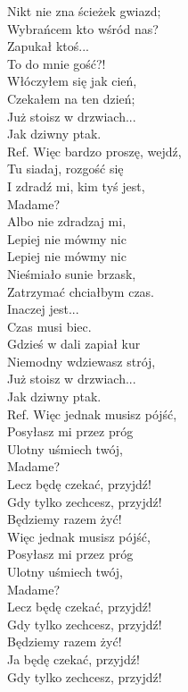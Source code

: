 
Nikt nie zna ścieżek gwiazd; \tab{}\\
Wybrańcem kto wśród nas? \tab{}\\
Zapukał ktoś... \tab{}\tab{}\\
To do mnie gość?! \tab{}\\
\hop
Włóczyłem się jak cień, \tab{}\\
Czekałem na ten dzień; \tab{}\\
Już stoisz w drzwiach... \tab{}\\
Jak dziwny ptak. \tab{}\\
\hops
Ref. Więc bardzo proszę, wejdź, \\
 Tu siadaj, rozgość się \tab{}\\
 I zdradź mi, kim tyś jest,\tab{} \\
 Madame?\tab{}\tab{} \\
 Albo nie zdradzaj mi, \tab{}\\
 Lepiej nie mówmy nic \tab{}\\
 Lepiej nie mówmy nic \tab{}\\
\hops
Nieśmiało sunie brzask, \\
Zatrzymać chciałbym czas. \\
Inaczej jest... \\
Czas musi biec. \\
\hop
Gdzieś w dali zapiał kur \\
Niemodny wdziewasz strój, \\
Już stoisz w drzwiach... \\
Jak dziwny ptak. \\
\hops
Ref. Więc jednak musisz pójść,\\
 Posyłasz mi przez próg \\
 Ulotny uśmiech twój, \\
 Madame? \\
 Lecz będę czekać, przyjdź! \\
 Gdy tylko zechcesz, przyjdź! \\
 Będziemy razem żyć! \\
\hops
{} Więc jednak musisz pójść, \\
 Posyłasz mi przez próg \\
 Ulotny uśmiech twój, \\
 Madame? \\
 Lecz będę czekać, przyjdź! \\
 Gdy tylko zechcesz, przyjdź! \\
 Będziemy razem żyć! \\
\hops
{} Ja będę czekać, przyjdź! \\
 Gdy tylko zechcesz, przyjdź! \\
